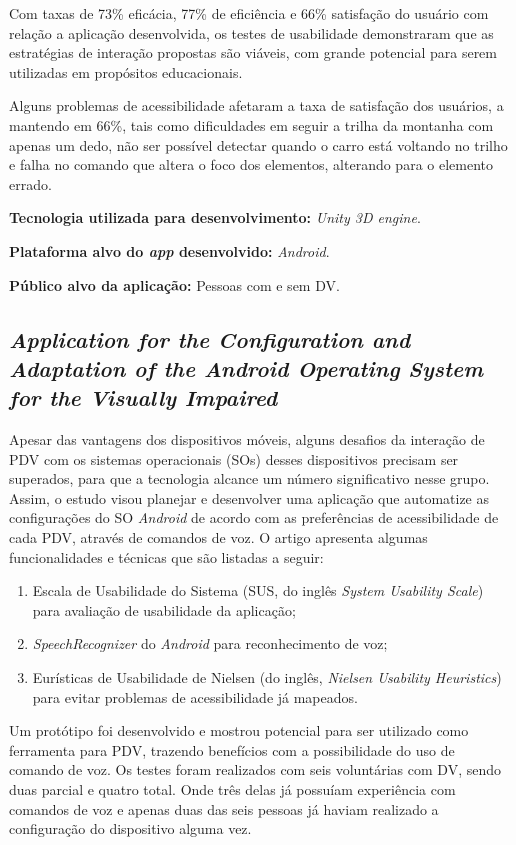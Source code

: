 Com taxas de 73\% eficácia, 77\% de eficiência e 66\% satisfação do usuário com relação a aplicação desenvolvida, os testes de usabilidade demonstraram que as estratégias de interação propostas são viáveis, com grande potencial para serem utilizadas em propósitos educacionais.

Alguns problemas de acessibilidade afetaram a taxa de satisfação dos usuários, a mantendo em 66\%, tais como dificuldades em seguir a trilha da montanha com apenas um dedo, não ser possível detectar quando o carro está voltando no trilho e falha no comando que altera o foco dos elementos, alterando para o elemento errado.

\textbf{Tecnologia utilizada para desenvolvimento:} \emph{Unity 3D engine}.

\textbf{Plataforma alvo do \emph{app} desenvolvido:} \emph{Android}.

\textbf{Público alvo da aplicação:} Pessoas com e sem DV.

\subsection{\emph{Application for the Configuration and Adaptation of the Android Operating System for the Visually Impaired}}

Apesar das vantagens dos dispositivos móveis, alguns desafios da interação de PDV com os sistemas operacionais (SOs) desses dispositivos precisam ser superados, para que a tecnologia alcance um número significativo nesse grupo. Assim, o estudo visou planejar e desenvolver uma aplicação que automatize as configurações do SO \emph{Android} de acordo com as preferências de acessibilidade de cada PDV, através de comandos de voz. O artigo apresenta algumas funcionalidades e técnicas que são listadas a seguir:

\begin{enumerate}
\item Escala de Usabilidade do Sistema (SUS, do inglês \emph{System Usability Scale}) para avaliação de usabilidade da aplicação;
\item \emph{SpeechRecognizer} do \emph{Android} para reconhecimento de voz;
\item Eurísticas de Usabilidade de Nielsen (do inglês, \emph{Nielsen Usability Heuristics}) para evitar problemas de acessibilidade já mapeados.
\end{enumerate}

Um protótipo foi desenvolvido e mostrou potencial para ser utilizado como ferramenta para PDV, trazendo benefícios com a possibilidade do uso de comando de voz. Os testes foram realizados com seis voluntárias com DV, sendo duas parcial e quatro total. Onde três delas já possuíam experiência com comandos de voz e apenas duas das seis pessoas já haviam realizado a configuração do dispositivo alguma vez.


